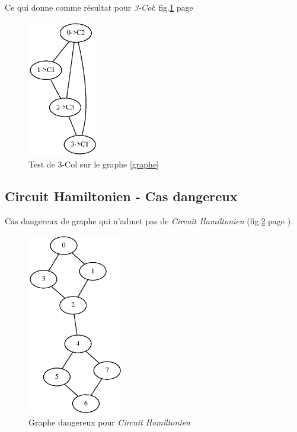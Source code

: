   Ce qui donne comme résultat pour \emph{3-Col}: fig.\ref{result} page
  \pageref{result}
  \begin{figure}[!ht]
   \begin{center}
    \includegraphics[height=6cm]{images/jeurapport.ps}
    \caption{Test de 3-Col sur le graphe \ref{graphe} \label{result}}
   \end{center}
  \end{figure}

  \newpage

  \subsection{Circuit Hamiltonien - Cas dangereux\label{an_warningCH}}
  Cas dangereux de graphe qui n'admet pas de \emph{Circuit Hamiltonien}
  (fig.\ref{warningCH} page \pageref{warningCH}).
  \begin{figure}[!ht]
   \begin{center}
    \includegraphics[height=8cm]{images/warningCH.eps}
    \caption{Graphe dangereux pour \emph{Circuit
    Hamiltonien}\label{warningCH}}
   \end{center}
  \end{figure}



